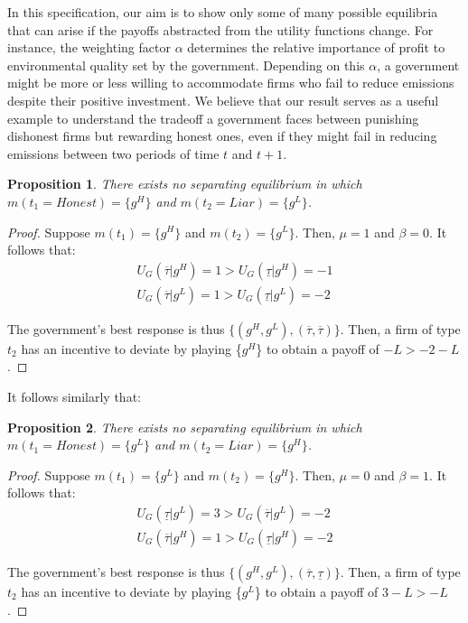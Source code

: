 \documentclass{article}
\newtheorem{proposition}{Proposition}
\begin{document}
In this specification, our aim is to show  only some of many possible equilibria that can arise if the payoffs abstracted from the utility functions change. For instance, the weighting factor $\alpha$ determines the relative importance of profit to environmental quality set by the government. Depending on this $\alpha$, a government might be more or less willing to accommodate firms who fail to reduce emissions despite their positive investment. We believe that our result serves as a useful example to understand the tradeoff a government faces between punishing dishonest firms but rewarding honest ones, even if they might fail in reducing emissions between two periods of time $t$ and $t+1$.

\begin{proposition}
    There exists no separating equilibrium in which $m(t_1 = Honest) = \{g^H\}$ and $m(t_2 = Liar) = \{g^L\}$.
\end{proposition}

\begin{proof}
    Suppose $m(t_1) = \{g^H\}$ and $m(t_2) = \{g^L\}$. Then, $\mu =1$ and $\beta = 0$. It follows that:
    \begin{align*}
        U_G(\overline{\tau} | g^H) = 1 > U_G(\underline{\tau} | g^H) = -1 \\
        U_G(\overline{\tau} | g^L) = 1 > U_G(\underline{\tau} | g^L) = -2
    \end{align*}

    The government's best response is thus $\{(g^H, g^L), (\overline{\tau}, \overline{\tau})\}$. 
    Then, a firm of type $t_2$ has an incentive to deviate by playing \{$g^H$\} to obtain a payoff of $-L > -2-L$.
\end{proof}
\vspace{0.5cm}

It follows similarly that: \\

\begin{proposition}
    There exists no separating equilibrium in which $m(t_1 = Honest) = \{g^L\}$ and $m(t_2 = Liar) = \{g^H\}$.
\end{proposition}

\begin{proof}
    Suppose $m(t_1) = \{g^L\}$ and $m(t_2) = \{g^H\}$. Then, $\mu =0$ and $\beta = 1$. It follows that:
    \begin{align*}
        U_G(\underline{\tau} | g^L) = 3 > U_G(\overline{\tau} | g^L) = -2 \\
        U_G(\overline{\tau} | g^H) = 1 > U_G(\underline{\tau} | g^H) = -2
    \end{align*}

    The government's best response is thus $\{(g^H, g^L), (\overline{\tau}, \underline{\tau})\}$. 
    Then, a firm of type $t_2$ has an incentive to deviate by playing \{$g^L$\} to obtain a payoff of $3-L > -L$.
\end{proof}
\vspace{0.5cm}
\end{document}
